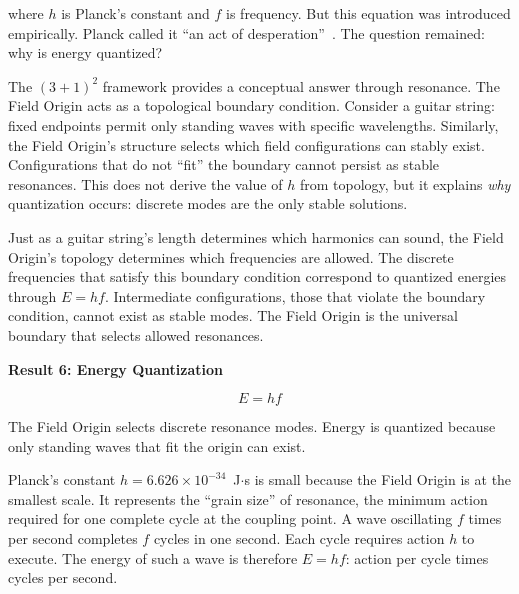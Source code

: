 \documentclass[aps,prd,preprint,superscriptaddress,showpacs,preprintnumbers,amsmath,amssymb,nofootinbib]{revtex4-2}
\begin{document}
where $h$ is Planck's constant and $f$ is frequency. But this equation was introduced empirically. Planck called it ``an act of desperation''~\cite{planck1931}. The question remained: why is energy quantized?

The $(3+1)^2$ framework provides a conceptual answer through resonance. The Field Origin acts as a topological boundary condition. Consider a guitar string: fixed endpoints permit only standing waves with specific wavelengths. Similarly, the Field Origin's structure selects which field configurations can stably exist. Configurations that do not ``fit'' the boundary cannot persist as stable resonances. This does not derive the value of $h$ from topology, but it explains \emph{why} quantization occurs: discrete modes are the only stable solutions.

Just as a guitar string's length determines which harmonics can sound, the Field Origin's topology determines which frequencies are allowed. The discrete frequencies that satisfy this boundary condition correspond to quantized energies through $E = hf$. Intermediate configurations, those that violate the boundary condition, cannot exist as stable modes. The Field Origin is the universal boundary that selects allowed resonances.

\vspace{1.5em}
\noindent
\colorbox{resultgreen}{\parbox{\dimexpr\textwidth-2\fboxsep\relax}{%
\vspace{0.8em}
\centering
\textbf{\large Result 6: Energy Quantization}

\vspace{0.5em}
\boldmath
\begin{equation}
E = hf
\end{equation}
\unboldmath

\vspace{0.3em}
The Field Origin selects discrete resonance modes. Energy is quantized because only standing waves that fit the origin can exist.
\vspace{0.5em}
}}
\vspace{1cm}

Planck's constant $h = 6.626 \times 10^{-34}$~J$\cdot$s is small because the Field Origin is at the smallest scale. It represents the ``grain size'' of resonance, the minimum action required for one complete cycle at the coupling point. A wave oscillating $f$ times per second completes $f$ cycles in one second. Each cycle requires action $h$ to execute. The energy of such a wave is therefore $E = hf$: action per cycle times cycles per second.
\end{document}
